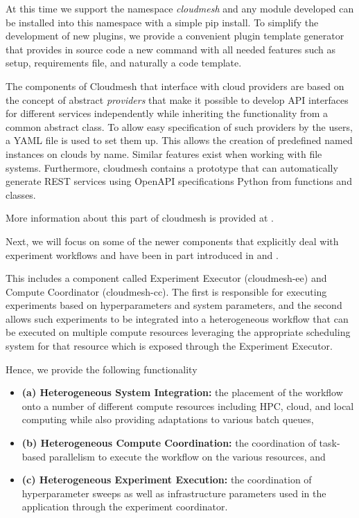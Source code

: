 \documentclass[utf8]{FrontiersinVancouver} %
\begin{document}
At this time we support the namespace {\em cloudmesh} and any module developed can be installed into this namespace with a simple pip install. To simplify the development of new plugins, we provide a convenient plugin template generator that provides in source code a new command with all needed features such as setup, requirements file, and naturally a code template. 

The components of Cloudmesh that interface with cloud providers are based on the concept of abstract {\em providers} that make it possible to develop API interfaces for different services independently while inheriting the functionality from a common abstract class. To allow easy specification of such providers by the users, a YAML file is used to set them up. This allows the creation of predefined named instances on clouds by name. Similar features exist when working with file systems.
Furthermore, cloudmesh contains a prototype that can automatically generate REST services using OpenAPI specifications Python from functions and classes. 

More information about this part of cloudmesh is provided at \citep{www-cloudmesh-org}.

Next, we will focus on some of the newer components that explicitly deal with experiment workflows
and have been in part introduced in 
\citep{las-2022-hybrid} and
\citep{las-2022-templated}.


This includes a component called Experiment Executor (cloudmesh-ee) and Compute Coordinator (cloudmesh-cc). The first is responsible for executing experiments based on hyperparameters and system parameters, and the second allows such experiments to be integrated into a heterogeneous workflow that can be executed on multiple compute resources leveraging the appropriate scheduling system for that resource which is exposed through the Experiment Executor.

Hence, we provide the following functionality 

\begin{itemize}
\item {\bf (a) Heterogeneous System Integration:} the placement
of the workflow onto a number of different compute resources
including HPC, cloud, and local computing while also providing adaptations to various batch queues, 
\item {\bf  (b) Heterogeneous Compute Coordination:} the coordination of task-based parallelism to execute
the workflow on the various resources, and 
\item  {\bf (c) Heterogeneous Experiment
Execution:} the coordination of hyperparameter sweeps as well as infrastructure parameters used
in the application through the experiment coordinator.  

\end{itemize}
\end{document}
